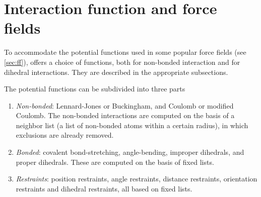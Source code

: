 %
%
%
%
%
%

\chapter{Interaction function and force fields}
\label{ch:ff}
To accommodate the potential functions used
in some popular force fields (see \ref{sec:ff}), {\gromacs} offers a choice of functions,
both for non-bonded interaction and for dihedral interactions. They
are described in the appropriate subsections.

The potential functions can be subdivided into three parts
\begin{enumerate}
\item   {\em Non-bonded}: Lennard-Jones or Buckingham, and Coulomb or
modified Coulomb. The non-bonded interactions are computed on the
basis of a neighbor list (a list of non-bonded atoms within a certain
radius), in which exclusions are already removed.
\item   {\em Bonded}: covalent bond-stretching, angle-bending,
improper dihedrals, and proper dihedrals. These are computed on the
basis of fixed lists. 
\item   {\em Restraints}: position restraints, angle restraints,
distance restraints, orientation restraints and dihedral restraints, all
based on fixed lists. 
\end{enumerate}

